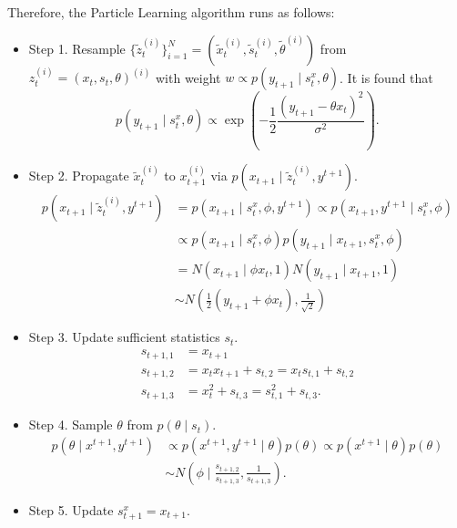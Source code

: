 Therefore, the Particle Learning algorithm runs as follows:
\begin{itemize}
\item Step 1. Resample $\{\tilde{z}_t^{(i)}\}_{i=1}^N=(\tilde{x}_t^{(i)},\tilde{s}_t^{(i)},\tilde{\theta}^{(i)})$ from $z_t^{(i)}=(x_t,s_t,\theta)^{(i)}$ with weight $w\propto p(y_{t+1}\mid s_{t}^x,\theta)$. It is found that \begin{equation*}
p(y_{t+1}\mid s_{t}^x,\theta) \propto \exp \left(-\frac{1}{2}\frac{(y_{t+1}-\theta x_{t})^2}{\sigma^2} \right).
\end{equation*}
\item Step 2. Propagate $\tilde{x}_t^{(i)}$ to $x_{t+1}^{(i)}$ via $p(x_{t+1}\mid \tilde{z}_t^{(i)},y^{t+1})$. 
\begin{align*}
p(x_{t+1}\mid \tilde{z}_t^{(i)},y^{t+1}) &= p(x_{t+1}\mid s_t^x,\phi,y^{t+1}) \propto p(x_{t+1},y^{t+1}\mid s_t^x,\phi)\\
&\propto p(x_{t+1}\mid s_t^x,\phi)p(y_{t+1}\mid x_{t+1},s_t^x,\phi) \\
&=N(x_{t+1}\mid \phi x_t,1)N(y_{t+1}\mid x_{t+1},1)\\
&\sim N(\frac{1}{2}(y_{t+1}+\phi x_t),\frac{1}{\sqrt{2}})
\end{align*}
\item Step 3. Update sufficient statistics $s_t$.
\begin{align*}
s_{t+1,1} &= x_{t+1} \\
s_{t+1,2} &= x_tx_{t+1}+s_{t,2} = x_ts_{t,1}+s_{t,2} \\
s_{t+1,3} &= x_{t}^2 + s_{t,3} = s_{t,1}^2 + s_{t,3} .
\end{align*}
\item Step 4. Sample $\theta$ from $p(\theta \mid  s_t)$.
\begin{align*}
p(\theta \mid  x^{t+1},y^{t+1}) & \propto p(x^{t+1},y^{t+1}\mid \theta)p(\theta)\propto p(x^{t+1}\mid \theta)p(\theta)\\
&\sim N\left( \phi \mid  \frac{s_{t+1,2}}{s_{t+1,3}},\frac{1}{s_{t+1,3}} \right).
\end{align*}
\item Step 5. Update $s_{t+1}^x = x_{t+1}$.
\end{itemize}





